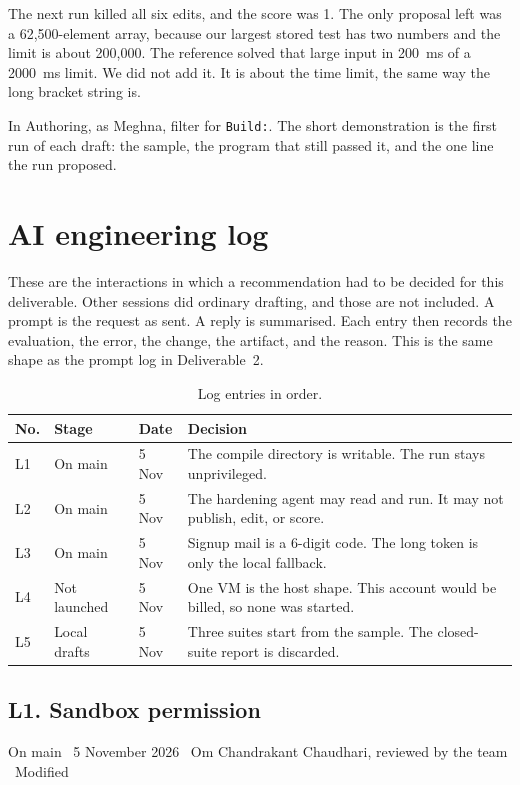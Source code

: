 \documentclass[11pt,a4paper]{article}
\newcommand{\meta}[1]{{\small #1}\par}
\begin{document}
The next run killed all six edits, and the score was 1. The only proposal left was a 62{,}500-element array, because our largest stored test has two numbers and the limit is about 200{,}000. The reference solved that large input in 200~ms of a 2000~ms limit. We did not add it. It is about the time limit, the same way the long bracket string is.

In Authoring, as Meghna, filter for \texttt{Build:}. The short demonstration is the first run of each draft: the sample, the program that still passed it, and the one line the run proposed.

\section{AI engineering log}
\label{sec:log}

These are the interactions in which a recommendation had to be decided for this deliverable. Other sessions did ordinary drafting, and those are not included. A prompt is the request as sent. A reply is summarised. Each entry then records the evaluation, the error, the change, the artifact, and the reason. This is the same shape as the prompt log in Deliverable~2.

\begin{table}[ht]
\centering
\caption{Log entries in order.}
\label{tab:record}
{\small
\begin{tabularx}{\textwidth}{@{}l l l Y@{}}
\toprule
No. & Stage & Date & Decision \\
\midrule
L1 & On main & 5 Nov &
The compile directory is writable. The run stays unprivileged. \\
L2 & On main & 5 Nov &
The hardening agent may read and run. It may not publish, edit, or score. \\
L3 & On main & 5 Nov &
Signup mail is a 6-digit code. The long token is only the local fallback. \\
L4 & Not launched & 5 Nov &
One VM is the host shape. This account would be billed, so none was started. \\
L5 & Local drafts & 5 Nov &
Three suites start from the sample. The closed-suite report is discarded. \\
\bottomrule
\end{tabularx}
}
\end{table}

\subsection{L1. Sandbox permission}
\meta{On main \textperiodcentered\ 5 November 2026 \textperiodcentered\ Om Chandrakant Chaudhari, reviewed by the team \textperiodcentered\ Modified}
\end{document}
